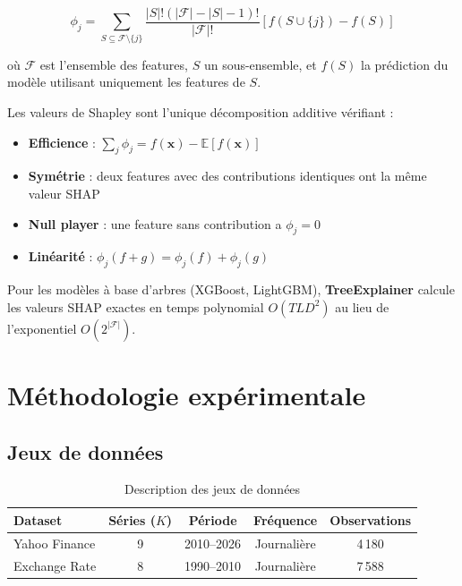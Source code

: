 \documentclass[12pt,a4paper]{article}
\newcounter{propctr}[section]
\renewcommand{\thepropctr}{\thesection.\arabic{propctr}}
\newenvironment{proposition}[1][]
  {\refstepcounter{propctr}\begin{tcolorbox}[propstyle,title={Proposition~\thepropctr\if\relax\detokenize{#1}\relax\else~--- #1\fi}]}
  {\end{tcolorbox}}
\newcommand{\E}{\mathbb{E}}
\newcommand{\bx}{\bm{x}}
\begin{document}
\begin{equation}
\phi_j = \sum_{S \subseteq \mathcal{F} \setminus \{j\}} \frac{|S|!(|\mathcal{F}|-|S|-1)!}{|\mathcal{F}|!} \left[f(S \cup \{j\}) - f(S)\right]
\end{equation}

o\`u $\mathcal{F}$ est l'ensemble des features, $S$ un sous-ensemble, et $f(S)$ la pr\'ediction du mod\`ele utilisant uniquement les features de $S$.

\begin{proposition}[Propri\'et\'es de SHAP]
Les valeurs de Shapley sont l'unique d\'ecomposition additive v\'erifiant :
\begin{itemize}
    \item \textbf{Efficience} : $\sum_{j} \phi_j = f(\bx) - \E[f(\bx)]$
    \item \textbf{Sym\'etrie} : deux features avec des contributions identiques ont la m\^eme valeur SHAP
    \item \textbf{Null player} : une feature sans contribution a $\phi_j = 0$
    \item \textbf{Lin\'earit\'e} : $\phi_j(f+g) = \phi_j(f) + \phi_j(g)$
\end{itemize}
\end{proposition}

Pour les mod\`eles \`a base d'arbres (XGBoost, LightGBM), \textbf{TreeExplainer} \cite{lundberg2020} calcule les valeurs SHAP exactes en temps polynomial $O(TLD^2)$ au lieu de l'exponentiel $O(2^{|\mathcal{F}|})$.

\section{M\'ethodologie exp\'erimentale}

\subsection{Jeux de donn\'ees}

\begin{table}[H]
\centering
\caption{Description des jeux de donn\'ees}
\begin{tabular}{lcccc}
\toprule
\textbf{Dataset} & \textbf{S\'eries ($K$)} & \textbf{P\'eriode} & \textbf{Fr\'equence} & \textbf{Observations} \\
\midrule
Yahoo Finance & 9 & 2010--2026 & Journali\`ere & 4\,180 \\
Exchange Rate & 8 & 1990--2010 & Journali\`ere & 7\,588 \\
\bottomrule
\end{tabular}
\end{table}
\end{document}

